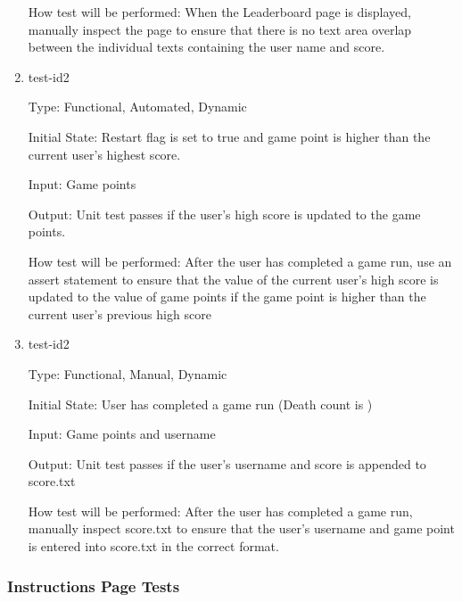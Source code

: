 \documentclass[12pt, titlepage]{article}
\begin{document}
\begin{enumerate}
		How test will be performed: When the Leaderboard page is displayed, manually inspect the page to 
		ensure that there is no text area overlap between the individual texts containing the user name and score. 
		
		
		\item{test-id2\\}
		
		Type: Functional, Automated, Dynamic 
		
		Initial State: Restart flag is set to true and game point is higher than the current user's highest score.
		
		Input: Game points
		
		Output: Unit test passes if the user's high score is updated to the game points.
		
		How test will be performed: After the user has completed a game run, use an assert statement to ensure that the value of the current user's high score is updated to the value of game points if the game point is higher than the current user's previous high score
		
		\item{test-id2\\}
		
		Type: Functional, Manual, Dynamic
		
		Initial State: User has completed a game run (Death count is )
		
		Input: Game points and username
		
		Output: Unit test passes if the user's username and score is appended to score.txt
		
		How test will be performed: After the user has completed a game run, manually inspect score.txt to ensure that the user's username and game point is entered into score.txt in the correct format.
		
	\end{enumerate}
	
	\subsubsection{Instructions Page Tests}
	
\end{document}
